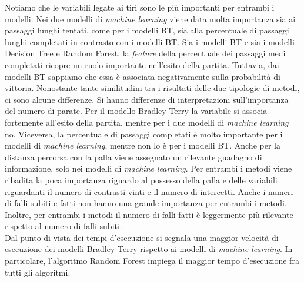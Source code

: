 Notiamo che le variabili legate ai tiri sono le più importanti per entrambi i modelli. Nei due modelli di \emph{machine learning} viene data molta importanza sia ai passaggi lunghi tentati, come per i modelli BT, sia alla percentuale di passaggi lunghi completati in contrasto con i modelli BT. 
Sia i modelli BT e sia i modelli Decision Tree e Random Forest, la \emph{feature} della percentuale dei passaggi medi completati ricopre un ruolo importante nell'esito della partita. Tuttavia, dai modelli BT sappiamo che essa è associata negativamente sulla probabilità di vittoria.
Nonostante tante similitudini tra i risultati delle due tipologie di metodi, ci sono alcune differenze. Si hanno differenze di interpretazioni sull'importanza del numero di parate. Per il modello Bradley-Terry la variabile si associa fortemente all'esito della partita, mentre per i due modelli di \emph{machine learning} no. Viceversa, la percentuale di passaggi completati è molto importante per i  modelli di \emph{machine learning}, mentre non lo è per i modelli BT. Anche per la distanza percorsa con la palla viene assegnato un rilevante guadagno di informazione, solo nei modelli di \emph{machine learning}. Per entrambi i metodi viene ribadita la poca importanza riguardo al possesso della palla e delle variabili riguardanti il numero di contrasti vinti e il numero di intercetti. Anche i numeri di falli subiti e fatti non hanno una grande importanza per entrambi i metodi. Inoltre, per entrambi i metodi il numero di falli fatti è leggermente più rilevante rispetto al numero di falli subiti.\\
Dal punto di vista dei tempi d'esecuzione si segnala una maggior velocità di esecuzione dei modelli Bradley-Terry rispetto ai modelli di \emph{machine learning}. In particolare, l'algoritmo Random Forest impiega il maggior tempo d'esecuzione fra tutti gli algoritmi.


